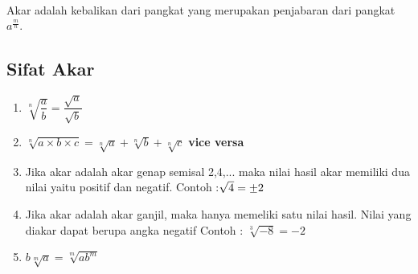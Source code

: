 \paragraph*{}
	Akar adalah kebalikan dari pangkat yang merupakan penjabaran dari pangkat $a^{\frac{m}{n}}$.
\subsection{Sifat Akar}
	\begin{multicols}{2}
		\begin{enumerate}
			\item $\sqrt[n]{\dfrac{a}{b}}=\dfrac{\sqrt{a}}{\sqrt{b}}$
			\item $\sqrt[n]{a\times b \times c}=\sqrt[n]{a}+\sqrt[n]{b}+\sqrt[n]{c}$ \textbf{vice versa}
			\item Jika akar adalah akar genap semisal 2,4,... maka nilai hasil akar memiliki dua nilai yaitu positif dan negatif. Contoh :$\sqrt{4}=\mypm 2$
			\item Jika akar adalah akar ganjil, maka hanya memeliki satu nilai hasil. Nilai yang diakar dapat berupa angka negatif Contoh : $\sqrt[3]{-8}=-2$ 
			\item $b\sqrt[m]{a}=\sqrt[m]{ab^m}$
		\end{enumerate}
	\end{multicols}